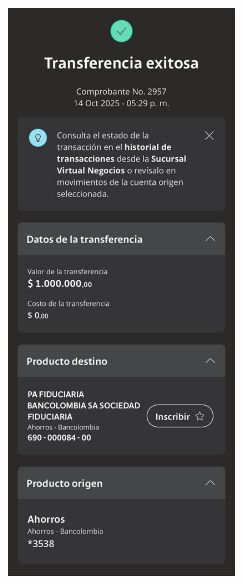 \documentclass[11pt,a4paper,sans]{moderncv}
\begin{document}
\begin{center}
    \includegraphics[width=0.45\textwidth]{comprobante.jpg}
\end{center}
\end{document}
